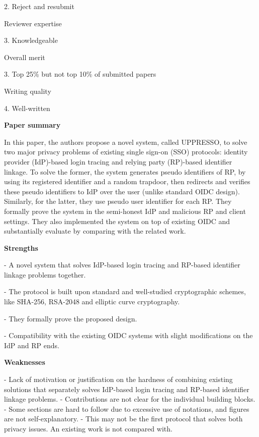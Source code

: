 \documentclass[letterpaper,onecolumn,10pt]{article}
\begin{document}
2. Reject and resubmit

Reviewer expertise


3. Knowledgeable

Overall merit


3. Top 25\% but not top 10\% of submitted papers

Writing quality


4. Well-written

\vspace{1mm}\noindent\textbf{Paper summary}


In this paper, the authors propose a novel system, called UPPRESSO, to solve two major privacy problems of existing single sign-on (SSO) protocols: identity provider (IdP)-based login tracing and relying party (RP)-based identifier linkage. To solve the former, the system generates pseudo identifiers of RP, by using its registered identifier and a random trapdoor, then redirects and verifies these pseudo identifiers to IdP over the user (unlike standard OIDC design). Similarly, for the latter, they use pseudo user identifier for each RP. They formally prove the system in the semi-honest IdP and malicious RP and client settings. They also implemented the system on top of existing OIDC and substantially evaluate by comparing with the related work.

\vspace{1mm}\noindent\textbf{Strengths}


-	A novel system that solves IdP-based login tracing and RP-based identifier linkage problems together.

-	The protocol is built upon standard and well-studied cryptographic schemes, like SHA-256, RSA-2048 and elliptic curve cryptography.

-	They formally prove the proposed design.

-	Compatibility with the existing OIDC systems with slight modifications on the IdP and RP ends.

\vspace{1mm}\noindent\textbf{Weaknesses}


-	Lack of motivation or justification on the hardness of combining existing solutions that separately solves IdP-based login tracing and RP-based identifier linkage problems.
-	Contributions are not clear for the individual building blocks.
-	Some sections are hard to follow due to excessive use of notations, and figures are not self-explanatory.
-	This may not be the first protocol that solves both privacy issues. An existing work is not compared with.
\end{document}
